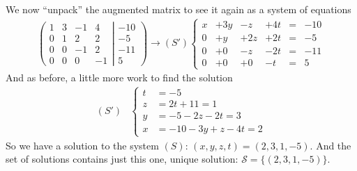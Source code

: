 \documentclass[usenames,dvipsnames,aspectratio=169,10pt]{beamer}
\numberwithin{equation}{section}
\begin{document}
\begin{frame}
We now ``unpack'' the augmented matrix to see it again as a system of equations
\begin{align*}
\left(
	\begin{matrix}
	   1 &   3 & -1 &   4 \\
	   0 &   1 &  2 &   2 \\
	   0 &   0 & -1 &   2 \\
	   0 &   0 &  0 &  -1
	\end{matrix}
  \left|
	\begin{matrix}
	 -10 \\
	  -5 \\
	 -11 \\
	   5
	\end{matrix}
  \right.
\right)
\longrightarrow
(S')
\left\{
\begin{matrix}
    x &+ 3y &-  z &+ 4t &=&  -10 \\
    0 &+  y &+ 2z &+ 2t &=&   -5 \\
    0 &+  0 &-  z &- 2t &=&  -11 \\
    0 &+  0 &+  0 &-  t &=&    5
\end{matrix}
\right.
\end{align*}
And as before, a little more work to find the solution
\begin{align*}
(S')
&\left\{
\begin{array}{ll}
   t &=  -5 \\
   z &=  2t +11 = 1\\
   y &=  -5 -2z - 2t = 3\\
   x &= -10 -3y + z - 4t = 2 	
\end{array}
\right. 
\end{align*}
So we have a solution to the system $(S)$: $(x,y,z,t)=(2,3,1,-5)$. And the set of solutions contains just this one, unique solution: $\mathcal{S}=\{(2,3,1,-5)\}$.

\end{frame}
\end{document}
